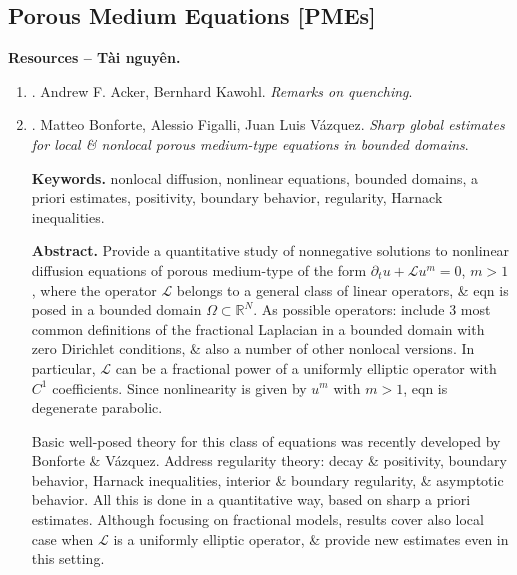 \documentclass{article}
\begin{document}
\subsection{Porous Medium Equations [PMEs]}
\textbf{\textsf{Resources -- Tài nguyên.}}
\begin{enumerate}
	\item \cite{Acker_Kawohl1989}. {\sc Andrew F. Acker, Bernhard Kawohl}. {\it Remarks on quenching}.\hfill{\sf[95 citations]}
	\item \cite{Bonforte_Figalli_Vazquez2018}. {\sc Matteo Bonforte, Alessio Figalli, Juan Luis V\'{a}zquez}. {\it Sharp global estimates for local \& nonlocal porous medium-type equations in bounded domains}.\hfill{\sf[55 citations]}
	
	{\bf Keywords.} nonlocal diffusion, nonlinear equations, bounded domains, a priori estimates, positivity, boundary behavior, regularity, Harnack inequalities.
	
	{\bf Abstract.} Provide a quantitative study of nonnegative solutions to nonlinear diffusion equations of porous medium-type of the form $\partial_tu + \mathcal{L}u^m = 0$, $m > 1$, where the operator $\mathcal{L}$ belongs to a general class of linear operators, \& eqn is posed in a bounded domain $\Omega\subset\mathbb{R}^N$. As possible operators: include 3 most common definitions of the fractional Laplacian in a bounded domain with zero Dirichlet conditions, \& also a number of other nonlocal versions. In particular, $\mathcal{L}$ can be a fractional power of a uniformly elliptic operator with $C^1$ coefficients. Since nonlinearity is given by $u^m$ with $m > 1$, eqn is degenerate parabolic.
	
	Basic well-posed theory for this class of equations was recently developed by Bonforte \& V\'azquez. Address regularity theory: decay \& positivity, boundary behavior, Harnack inequalities, interior \& boundary regularity, \& asymptotic behavior. All this is done in a quantitative way, based on sharp a priori estimates. Although focusing on fractional models, results cover also local case when $\mathcal{L}$ is a uniformly elliptic operator, \& provide new estimates even in this setting.
	

\end{enumerate}
\end{document}
